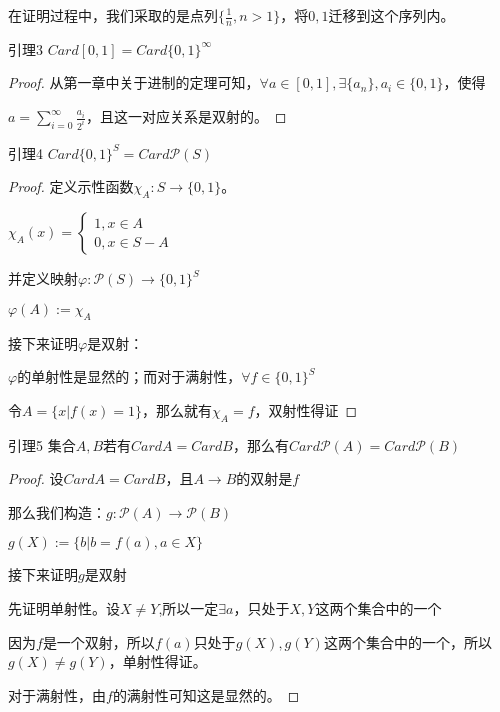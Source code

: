 \documentclass[12pt, a4paper, oneside, UTF8]{ctexbook}
\begin{document}
			在证明过程中，我们采取的是点列$\{\frac{1}{n},n>1\}$，将$0,1$迁移到这个序列内。
			\begin{lemma}{引理3}{}
				$Card [0,1] = Card \{0,1\}^\infty$
			\end{lemma}
			\begin{proof}
				从第一章中关于进制的定理可知，$\forall a \in [0,1],\exists \{a_n\},a_i \in \{0,1\}$，使得
				
				$a = \sum\limits_{i=0}^{\infty}\frac{a_i}{2^i}$，且这一对应关系是双射的。
			\end{proof}
			\begin{lemma}{引理4}{}
				$Card \{0,1\}^S = Card \mathscr{P}(S)$
			\end{lemma}
			\begin{proof}
				定义示性函数$\chi_A:S\rightarrow\{0,1\}$。
				
				$\chi_A(x) = \begin{cases}
					1,x \in A \\
					0,x \in S-A
				\end{cases}$
				
				并定义映射$\varphi : \mathscr{P}(S)\rightarrow \{0,1\}^S$
				
				$\varphi(A) := \chi_A$
				
				接下来证明$\varphi$是双射：
				
				$\varphi$的单射性是显然的；而对于满射性，$\forall f \in \{0,1\}^S$
				
				令$A = \{x|f(x)=1\}$，那么就有$\chi_A=f$，双射性得证
			\end{proof}
			\begin{lemma}{引理5}
				集合$A,B$若有$Card A = Card B$，那么有$Card \mathscr{P}(A) = Card \mathscr{P}(B)$
			\end{lemma}
			\begin{proof}
				设$Card A=Card B$，且$A\rightarrow B$的双射是$f$
				
				那么我们构造：$g:\mathscr{P}(A)\rightarrow\mathscr{P}(B)$
				
				$g(X) := \{b|b=f(a),a\in X\}$
				
				接下来证明$g$是双射
				
				先证明单射性。设$X\neq Y$,所以一定$\exists a$，只处于$X,Y$这两个集合中的一个
				
				因为$f$是一个双射，所以$f(a)$只处于$g(X),g(Y)$这两个集合中的一个，所以$g(X)\neq g(Y)$，单射性得证。
				
				对于满射性，由$f$的满射性可知这是显然的。
			\end{proof}
\end{document}
